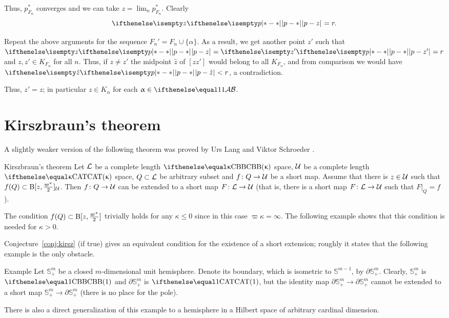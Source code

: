 Thus, $p^*_{F_n}$ converges and we can take $z=\lim_n p^*_{F_n}$.
Clearly 
\[\dist{p}{z}{}=r.\]

Repeat the above arguments for  the sequence $F_n'=F_n\cup \{\alpha\}$.
As a result, we get another point $z'$ such that $\dist{p}{z}{}=\dist{p}{z'}{}=r$ and 
$z,z'\in K_{F_n}$ for all $n$.
Thus, if $z\not=z'$ the midpoint $\hat z$ of $[zz']$ would belong to all 
$K_{F_n}$, and from comparison we would have $\dist{p}{\hat z}{}<r$, a contradiction.

Thus, $z'=z$; in particular 
$z\in K_\alpha$ for each $\alpha\in\IndexSet$.
\qeds



\section{Kirszbraun's theorem}\label{sec:kirszbraun}

A slightly weaker version of the following theorem was proved by Urs Lang and Viktor Schroeder \cite{lang-schroeder}.

\begin{thm}{Kirszbraun's theorem}
\label{thm:kirsz+}
Let
$\mathcal{L}$ be a complete length $\Alex{\kappa}$ space, 
$\mathcal{U}$ be a complete length $\CAT\kappa$ space, 
$Q\subset \spc{L}$ be arbitrary subset
and $f\: Q\to\spc{U}$ be a short map.
Assume that there is $z\in\spc{U}$ such that 
$f(Q)\subset \oBall[z,\tfrac{\varpi\kappa}{2}]_{\spc{U}}$.
Then $f\:Q\to\spc{U}$ can be extended to a short map 
$F\:\spc{L}\to \spc{U}$
(that is, there is a short map $F\:\spc{L}\to \spc{U}$ such that $F|_Q=f$).
\end{thm}
 
The condition $f(Q)\subset \oBall[z,\tfrac{\varpi\kappa}{2}]$ trivially holds for any $\kappa\le 0$ since in this case $\varpi\kappa=\infty$. 
The following example shows that this condition is needed for $\kappa>0$.

Conjecture~\ref{conj:kirsz} (if true) gives an equivalent condition for the existence of a short extension;
roughly it states that the following example is the only obstacle.

\begin{thm}{Example}\label{example:SS_+}
Let $\mathbb{S}^m_+$ be a closed $m$-dimensional unit hemisphere.  Denote its boundary, which is isometric to $\mathbb{S}^{m-1}$, by  $\partial\mathbb{S}^m_+$.
Clearly, $\mathbb{S}^m_+$ is $\Alex{1}$ and $\partial\mathbb{S}^m_+$ is $\CAT1$, but the identity map ${\partial\mathbb{S}^m_+}\to \partial\mathbb{S}^m_+$ cannot be extended to a short map $\mathbb{S}^m_+\to \partial\mathbb{S}^m_+$ (there is no place for the pole).

There is also a direct generalization of this example to a hemisphere in a Hilbert space of arbitrary cardinal dimension.
\end{thm}

